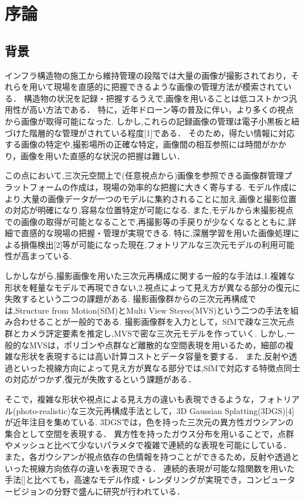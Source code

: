 \section{序論}\label{sec:intro}
\subsection{背景}\label{subsec:background}

インフラ構造物の施工から維持管理の段階では大量の画像が撮影されており，それらを用いて現場を直感的に把握できるような画像の管理方法が模索されている．
構造物の状況を記録・把握するうえで,画像を用いることは低コストかつ汎用性が高い方法である．
特に，近年ドローン等の普及に伴い，より多くの視点から画像が取得可能になった. 
しかし,これらの記録画像の管理は電子小黒板と紐づけた階層的な管理がされている程度[1]である．
そのため，得たい情報に対応する画像の特定や,撮影場所の正確な特定，画像間の相互参照には時間がかかり，画像を用いた直感的な状況の把握は難しい．\par

この点において,三次元空間上で(任意視点から)画像を参照できる画像群管理プラットフォームの作成は，現場の効率的な把握に大きく寄与する.
モデル作成により,大量の画像データが一つのモデルに集約されることに加え,画像と撮影位置の対応が明確になり,容易な位置特定が可能になる.
また,モデルから未撮影視点での画像の取得が可能となることで,再撮影等の手戻りが少なくなるとともに,詳細で直感的な現場の把握・管理が実現できる.
特に,深層学習を用いた画像処理による損傷検出[2]等が可能になった現在,フォトリアルな三次元モデルの利用可能性が高まっている.\par

しかしながら,撮影画像を用いた三次元再構成に関する一般的な手法は,1.複雑な形状を軽量なモデルで再現できない,2.視点によって見え方が異なる部分の復元に失敗するという二つの課題がある.
撮影画像群からの三次元再構成では,Structure from Motion(SfM)とMulti View Stereo(MVS)という二つの手法を組み合わせることが一般的である.
撮影画像群を入力として，SfMで疎な三次元点群とカメラ評定要素を推定し,MVSで密な三次元モデルを作っていく.
しかし,一般的なMVSは，ポリゴンや点群など離散的な空間表現を用いるため，細部の複雑な形状を表現するには高い計算コストとデータ容量を要する．
また,反射や透過といった視線方向によって見え方が異なる部分では,SfMで対応する特徴点同士の対応がつかず,復元が失敗するという課題がある．\par

そこで，複雑な形状や視点による見え方の違いも表現できるような，フォトリアル(photo-realistic)な三次元再構成手法として，3D Gaussian Splatting(3DGS)[4]が近年注目を集めている.
3DGSでは，色を持った三次元の異方性ガウシアンの集合として空間を表現する．
異方性を持ったガウス分布を用いることで，点群やメッシュと比べて少ないパラメタで複雑で連続的な表現を可能にしている．
また，各ガウシアンが視点依存の色情報を持つことができるため，反射や透過といった視線方向依存の違いを表現できる．
連続的表現が可能な陰関数を用いた手法[]と比べても，高速なモデル作成・レンダリングが実現でき，コンピュータービジョンの分野で盛んに研究が行われている．\par

